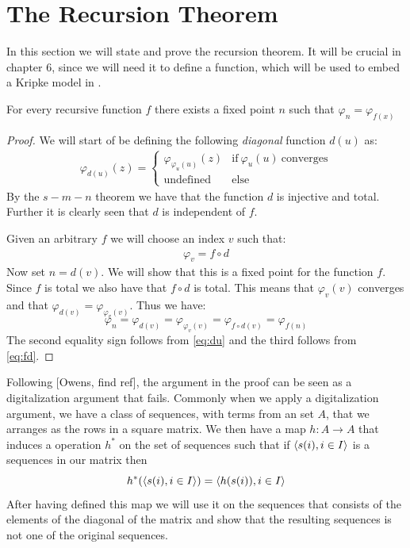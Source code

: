 \documentclass[../main.tex]{subfiles}
\begin{document}
\section{The Recursion Theorem}
In this section we will state and prove the recursion theorem. It will be
crucial in chapter 6, since we will need it to define a function, which will be
used to embed a Kripke model in \PRA.
\begin{thm}
	For every recursive function $f$ there exists a fixed point $n$ such
	that $\varphi_n=\varphi_{f(x)}$
\end{thm}
\begin{proof}
	We will start of be defining the following \textit{diagonal} function
	$d(u)$ as:
	\begin{align}
		\label{eq:du}
		\varphi_{d(u)}(z)=\begin{cases}
		\varphi_{\varphi_u(u)}(z)& \text{if}\ \varphi_u(u)\
		\text{converges}\\
		\text{undefined} & \text{else}
	\end{cases}
	\end{align}
	By the $s-m-n$ theorem we have that the function $d$ is injective and
	total. Further it is clearly seen that $d$ is independent of $f$.

	Given an arbitrary $f$ we will choose an index $v$ such that:
	\begin{align}
		\label{eq:fd}
		\varphi_v=f\circ d
	\end{align}
	Now set $n=d(v)$. We will show that this is a fixed point for the
	function $f$. Since $f$ is total we also have that $f\circ d$ is total.
	This means that $\varphi_v(v)$ converges and that
	$\varphi_{d(v)}=\varphi_{\varphi_v(v)}$. Thus we have:
	$$\varphi_n=\varphi_{d(v)}=\varphi_{\varphi_v(v)}=\varphi_{f\circ
	d(v)}=\varphi_{f(n)}$$
	The second equality sign follows from \ref{eq:du} and the third follows
	from \ref{eq:fd}.
\end{proof}
Following [Owens, find ref], the argument in the proof can be seen as a
digitalization argument that fails. Commonly when we apply a digitalization
argument, we have a class of sequences, with terms from an set $A$, that we arranges as the rows in a square
matrix. We then have a map $h:A\rightarrow A$ that induces a operation $h^*$ on
the set of sequences such that if $\langle s(i),i\in I\rangle$ is a sequences in our
matrix then 
$$h^*(\langle s(i),i\in I\rangle)=\langle h(s(i)),i\in I\rangle$$
After having defined this map we will use it on the sequences that consists of
the elements of the  diagonal of the matrix and
show that the resulting sequences is not one of the original sequences. 
\end{document}
